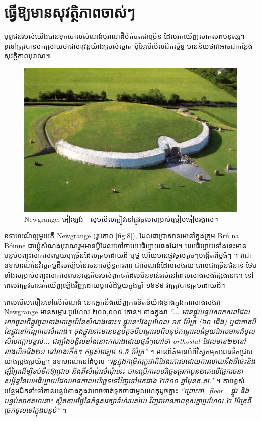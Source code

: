 \documentclass[10pt,twocolumn,letterpaper]{article}
\begin{document}
\section{ធ្វើឱ្យមានសុវត្ថិភាពចាស់ៗ}

បុព្វជនរបស់យើងបានទុកចោលសំណង់បុរាណដ៏ម៉ត់ចត់ជាច្រើន ដែលរកឃើញសាកសពមនុស្ស។ ទូទៅត្រូវបានបកស្រាយថា​ជា​បสุវន្តយ៉ាងស្រស់ស្អាត ប៉ុន្តែបើមើលជិតស្និទ្ធ មានន័យថា​វា​អាច​ជាកន្លែងសុវត្ថិភាពបុរាណ៕

\begin{figure}[b]
\begin{center}
   \includegraphics[width=1\linewidth]{ww19.jpg}
\end{center}
   \caption{Newgrange, អៀរឡង់ - សូមមើលភ្ញៀវនៅផ្លូវចូលសម្រាប់ប្រៀបធៀបរង្វាស។}
\label{fig:8}
\label{fig:onecol}
\end{figure}

ឧទាហរណ៍ល្អមួយគឺ Newgrange (រូបភាព \ref{fig:8}), ដែល​ជា​ប្រាសាទ​មេ​នៅក្នុងក្រុម Brú na Bóinne ជាឃ្លុំសំណង់បុរាណរួមមានអ្វីដែលហៅថា​បរអធិប្បាយផងដែរ។ បរអធិប្បាយទាំងនេះមានបន្ទប់បញ្ចុះសាកសពមួយឬច្រើនដែលគ្របដោយដី ឬថ្ម ហើយមានផ្លូវចូលតូចៗបង្កើតពីថ្មធំៗ \cite{70}។ វាជាឧទាហរណ៍នៃវិស្វកម្មដ៏សម្បើមនៃរចនាសម្ព័ន្ធការពារ ជាសំណង់ដែលសង់រយៈពេលជាច្រើនជំនាន់ ថែមទាំងសម្រាប់បញ្ចុះសាកសពមនុស្សតិចរបស់ពួកគេដែលមិនទាន់រស់នៅពេលសាងសង់ផ្សែងនោះ។ នៅពេលវាត្រូវបានរកឃើញឡើងវិញដោយម្ចាស់ដីមួយក្នុងឆ្នាំ ១៦៩៩ វាត្រូវបានគ្របដោយដី។

ពេលមើលលឿនទៅលើសំណង់ នោះអ្នកនឹងឃើញការខិតខំយ៉ាងខ្លាំងក្នុងការសាងសង់វា - Newgrange មានសម្ភារៈប្រហែល ២០០,០០០ តោន។ ខាងក្នុងវា \textit{“... មានផ្លូវបន្ទប់សាកសពដែលអាចចូលពីផ្លូវចូលខាងអាគ្នេយ៍នៃសំណង់នោះ។ ផ្លូវនេះវែងប្រហែល ១៩ ម៉ែត្រ (៦០ ជើង) ឬជាភាគបីនៃផ្លូវទៅកណ្ដាលសំណង់។ ចុងផ្លូវនោះមានបន្ទប់តូចបីបណ្តាលពីបន្ទប់កណ្តាលធំមួយដែលមានដំបូលសិលាក្ដោបខ្ពស់... ជញ្ជាំងបង្វិលទាំងនោះកសាងដោយថ្មធំៗហៅថា orthostat ដែលមាន២២នៅខាងលិចនិង២១ នៅខាងកើត។ កម្ពស់មធ្យម ១.៥ ម៉ែត្រ”} \cite{70}។ មានព័ត៌មានអំពីវិស្វកម្មការពារទឹកជ្រាបយ៉ាងប្រុងប្រយ័ត្ន។ ឧទាហរណ៍នៅដំបូល \textit{“រន្ធក្នុងកម្រិតរុក្ខជាតិដែងកោសដោយការលាយនឹងដីឆេះនិងផ្សំព្រៃដើម្បីទប់ទឹកឱ្យជ្រាប និងពីសំណុំសំណុំនេះ បានប្រើកាលបរិច្ឆេទធូរកាបូន២គេលើផ្នែករចនាសម្ព័ន្ធនៃបរអធិប្បាយដែលមានកាលបរិច្ឆេទទៅវិញទៅមកជាង ២៥០០ ឆ្នាំមុន​គ.ស."} \cite{71}។ ភាពខ្ពស់បន្ថែមដឹកនាំទៅកាន់បន្ទប់ខាងក្នុងវាអាចចាត់ទុកថាជាមូលហេតុដូចគ្នា៖ \textit{“ព្រោះថា\_floor\_ ផ្លូវ និងបន្ទប់សាកសពនោះ ស្ថិតតាមថ្ងៃនៃគំនូសរក្សាទំហំរបស់បរ វិញវាមានភាពខុសគ្នាប្រហែល ២ ម៉ែត្រពីច្រកចូលទៅក្នុងបន្ទប់”} \cite{71}។
\end{document}
